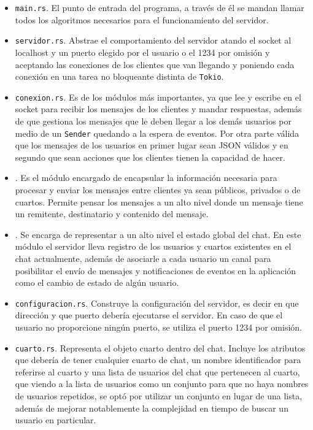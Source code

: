 \documentclass[12pt]{article}
\begin{document}
\begin{itemize}

\item \texttt{main.rs}. El punto de entrada del programa, a través de él se mandan llamar todos los algoritmos necesarios para el funcionamiento del servidor.

\item \texttt{servidor.rs}. Abstrae el comportamiento del servidor atando el socket al localhost y un puerto elegido por el usuario o el 1234 por omisión y aceptando las conexiones de los clientes que van llegando y poniendo cada conexión en una tarea no bloqueante distinta de \texttt{Tokio}.

\item \texttt{conexion.rs}. Es de los módulos más importantes, ya que lee y escribe en el socket para recibir los mensajes de los clientes y mandar respuestas, además de que gestiona los mensajes que le deben llegar a los demás usuarios por medio de un \texttt{Sender} quedando a la espera de eventos. Por otra parte válida que los mensajes de los usuarios en primer lugar sean JSON válidos y en segundo que sean acciones que los clientes tienen la capacidad de hacer.

\item \texttt{}. Es el módulo encargado de encapsular la información necesaria para procesar y enviar los mensajes entre clientes ya sean públicos, privados o de cuartos. Permite pensar los mensajes a un alto nivel donde un mensaje tiene un remitente, destinatario y contenido del mensaje.

\item \texttt{}. Se encarga de representar a un alto nivel el estado global del chat. En este módulo el servidor lleva registro de los usuarios y cuartos existentes en el chat actualmente, además de asociarle a cada usuario un canal para posibilitar el envío de mensajes y notificaciones de eventos en la aplicación como el cambio de estado de algún usuario.

\item \texttt{configuracion.rs}. Construye la configuración del servidor, es decir en que dirección y que puerto debería ejecutarse el servidor. En caso de que el usuario no proporcione ningún puerto, se utiliza el puerto 1234 por omisión.

\item \texttt{cuarto.rs}. Representa el objeto cuarto dentro del chat. Incluye los atributos que debería de tener cualquier cuarto de chat, un nombre identificador para referirse al cuarto y una lista de usuarios del chat que pertenecen al cuarto, que viendo a la lista de usuarios como un conjunto para que no haya nombres de usuarios repetidos, se optó por utilizar un conjunto en lugar de una lista, además de mejorar notablemente la complejidad en tiempo de buscar un usuario en particular.


\end{itemize}
\end{document}
